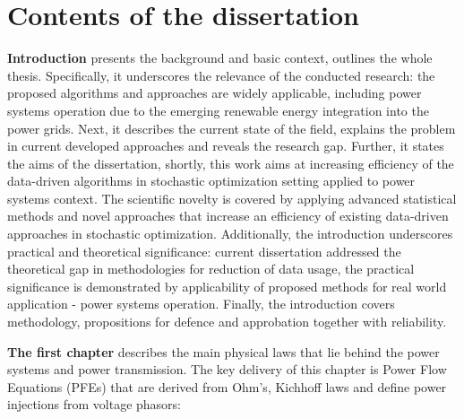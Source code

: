 \section*{Contents of the dissertation}

\textbf{Introduction} presents the background and basic context, outlines the whole thesis. Specifically, it underscores the relevance of the conducted research: the proposed algorithms and approaches are widely applicable, including power systems operation due to the emerging renewable energy integration into the power grids. Next, it describes the current state of the field, explains the problem in current developed approaches and reveals the research gap. Further, it states the aims of the dissertation, shortly, this work aims at increasing efficiency of the data-driven algorithms in stochastic optimization setting applied to power systems context. The scientific novelty is covered by applying advanced statistical methods and novel approaches that increase an efficiency of existing data-driven approaches in stochastic optimization. Additionally, the introduction underscores practical and theoretical significance: current dissertation addressed the theoretical gap in methodologies for reduction of data usage, the practical significance is demonstrated by applicability of proposed methods for real world application - power systems operation. Finally, the introduction covers methodology, propositions for defence and approbation together with reliability.


\textbf{The first chapter} describes the main physical laws that lie behind the power systems and power transmission. The key delivery of this chapter is Power Flow Equations (PFEs) that are derived from Ohm's, Kichhoff laws and define power injections from voltage phasors:

